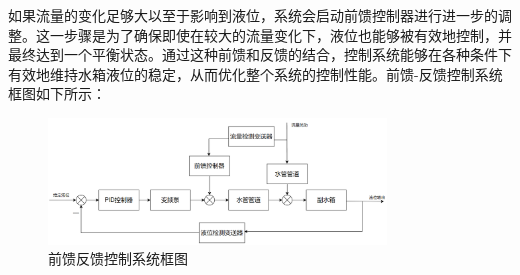 \documentclass[UTF8]{article}
\begin{document}
如果流量的变化足够大以至于影响到液位，系统会启动前馈控制器进行进一步的调整。这一步骤是为了确保即使在较大的流量变化下，液位也能够被有效地控制，并最终达到一个平衡状态。通过这种前馈和反馈的结合，控制系统能够在各种条件下有效地维持水箱液位的稳定，从而优化整个系统的控制性能。前馈-反馈控制系统框图如下所示：
\begin{figure}[H]
    \centering %
    \includegraphics[width=0.8\textwidth]{figure/前馈反馈控制系统框图.png} 
    \caption{前馈反馈控制系统框图} %
\end{figure}

\end{document}

